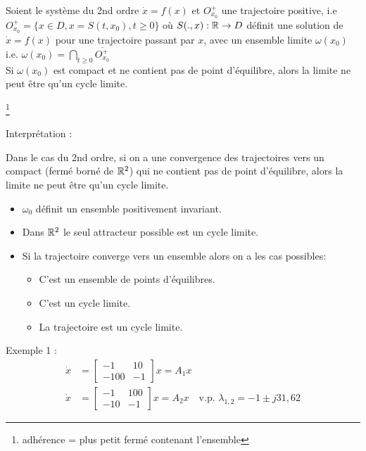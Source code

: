 \documentclass[main.tex]{subfiles}
\begin{document}
\begin{thm}
Soient le système du 2nd ordre $\dot{x}=f(x)$ et $O_{x_0}^+$ une trajectoire positive, i.e $O_{x_0}^+ = \{ x \in D, x = S(t,x_0), t \geq 0\}$ où $S(.,x) : \mathbb{R} \rightarrow D$ définit une solution de $\dot{x}=f(x)$ pour une trajectoire passant par $x$, avec un ensemble limite $\omega(x_0)$ i.e. \footnotemark $\omega(x_0) = \bigcap_{t \geq 0} \overline{O_{x_0}^+}$ \\

Si $\omega(x_0)$ est compact et ne contient pas de point d'équilibre, alors la limite ne peut être qu'un cycle limite.\\
\end{thm}
\footnote{adhérence = plus petit fermé contenant l'ensemble}

Interprétation :

Dans le cas du 2nd ordre, si on a une convergence des trajectoires vers un compact (fermé borné de $\mathbb{R}^2$) qui ne contient pas de point d'équilibre, alors la limite ne peut être qu'un cycle limite.\\

\begin{prop}
  \begin{itemize}
  \item $\omega_0$ définit un ensemble positivement invariant.
  \item Dans $\mathbb{R}^2$ le seul attracteur possible est un cycle limite.
  \item Si la trajectoire converge vers un ensemble alors on a les cas possibles:
    \begin{itemize}
    \item C'est un ensemble de points d'équilibres.
    \item C'est un cycle limite.
    \item La trajectoire est un cycle limite.
    \end{itemize}
  \end{itemize}
\end{prop}

Exemple 1 :
\begin{align*}
\dot{x} & =
          \begin{bmatrix}
-1 & 10 \\-100 & -1
\end{bmatrix} x = A_1x\\
\dot{x} & =
          \begin{bmatrix}
-1 & 100 \\ -10 & -1
\end{bmatrix}x = A_2x
\quad \text{v.p. } \lambda_{1,2} = -1 \pm j31,62
\end{align*}
\end{document}
